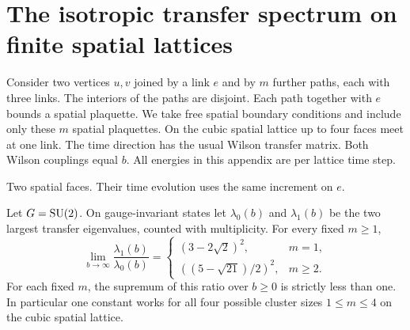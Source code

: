 \section{The isotropic transfer spectrum on finite spatial lattices}
\label{app:isotropic-link}
Consider two vertices \(u,v\) joined by a link \(e\) and by \(m\) further
paths, each with three links. The interiors of the paths are disjoint.
Each path together with \(e\) bounds a spatial plaquette. We take free spatial
boundary conditions and include only these \(m\) spatial plaquettes.
On the cubic spatial lattice up to four faces meet at one link. The time
direction has the usual Wilson transfer matrix. Both Wilson couplings equal
\(b\). All energies in this appendix are per lattice time step.

\begin{center}

\small Two spatial faces. Their time evolution uses the same increment on \(e\).
\end{center}

\begin{theorem}\label{thm:isotropic-book}
Let \(G=\mathrm{SU}(2)\). On gauge-invariant states let \(\lambda_0(b)\) and
\(\lambda_1(b)\) be the two largest transfer eigenvalues, counted with
multiplicity. For every fixed \(m\ge1\),
\[
 \lim_{b\to\infty}\frac{\lambda_1(b)}{\lambda_0(b)}
 =
 \begin{cases}
 (3-2\sqrt2)^2,&m=1,\\[2pt]
 ((5-\sqrt{21})/2)^2,&m\ge2 .
 \end{cases}
\]
For each fixed \(m\), the supremum of this ratio over \(b\ge0\) is strictly
less than one. In particular one constant works for all four possible
cluster sizes \(1\le m\le4\) on the cubic spatial lattice.
\end{theorem}

